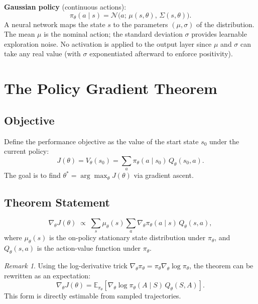 \documentclass[11pt,a4paper]{article}
\theoremstyle{definition}
\theoremstyle{plain}
\theoremstyle{remark}
\newtheorem*{remark}{Remark}
\begin{document}
\textbf{Gaussian policy} (continuous actions):
\[
    \pi_\theta(a \mid s) = \mathcal{N}\!\bigl(a;\, \mu(s,\theta),\, \Sigma(s,\theta)\bigr).
\]
A neural network maps the state $s$ to the parameters $(\mu, \sigma)$ of the distribution. The mean $\mu$ is the nominal action; the standard deviation $\sigma$ provides learnable exploration noise. No activation is applied to the output layer since $\mu$ and $\sigma$ can take any real value (with $\sigma$ exponentiated afterward to enforce positivity).

\section{The Policy Gradient Theorem}

\subsection{Objective}

Define the performance objective as the value of the start state $s_0$ under the current policy:
\[
    J(\theta) = V_\theta(s_0) = \sum_a \pi_\theta(a \mid s_0)\, Q_\theta(s_0, a).
\]
The goal is to find $\theta^* = \arg\max_\theta J(\theta)$ via gradient ascent.

\subsection{Theorem Statement}

\begin{tcolorbox}[colback=blue!5!white,colframe=blue!75!black,title=\textbf{Policy Gradient Theorem}]
\[
    \nabla_\theta J(\theta) \;\propto\; \sum_s \mu_\theta(s) \sum_a \nabla_\theta \pi_\theta(a \mid s)\, Q_\theta(s, a),
\]
where $\mu_\theta(s)$ is the on-policy stationary state distribution under $\pi_\theta$, and $Q_\theta(s,a)$ is the action-value function under $\pi_\theta$.
\end{tcolorbox}

\begin{remark}
Using the log-derivative trick $\nabla_\theta \pi_\theta = \pi_\theta \nabla_\theta \log \pi_\theta$, the theorem can be rewritten as an expectation:
\[
    \nabla_\theta J(\theta) = \mathbb{E}_{\pi_\theta}\!\left[\nabla_\theta \log \pi_\theta(A \mid S)\, Q_\theta(S, A)\right].
\]
This form is directly estimable from sampled trajectories.
\end{remark}
\end{document}
